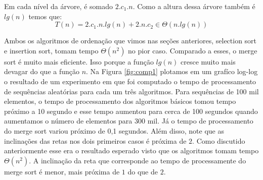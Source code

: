 \begin{center}
\end{center}

Em cada nível da árvore, é somado $2.c_1.n$.
Como a altura dessa árvore também é $lg(n)$ temos que:
\begin{displaymath}
  T(n) = 2.c_1.n.lg(n) + 2.n.c_2 \in \Theta(n.lg(n))
\end{displaymath}

Ambos os algoritmos de ordenação que vimos nas seções anteriores, selection sort e insertion sort, tomam tempo $\Theta(n^2)$ no pior caso.
Comparado a esses, o merge sort é muito mais eficiente.
Isso porque a função $lg(n)$ cresce muito mais devagar do que a função $n$.
Na Figura \ref{fig:comp1} plotamos em um grafíco log-log o resultado de um experimento em que foi computado o tempo de processamento de sequências aleatórias para cada um três algoritmos.
Para sequências de 100 mil elementos, o tempo de processamento dos algoritmos básicos tomou tempo próximo a 10 segundo e esse tempo aumentou para cerca de 100 segundos quando aumentamos o número de elementos para 300 mil.
Já o tempo de processamento do merge sort variou próximo de 0,1 segundos.
Além disso, note que as inclinações das retas nos dois primeiros casos é próxima de $2$.
Como discutido anteriormente esse era o resultado esperado visto que os algoritmos tomam tempo $\Theta(n^2)$.
A inclinação da reta que corresponde ao tempo de processamente do merge sort é menor, mais próxima de $1$ do que de $2$.

